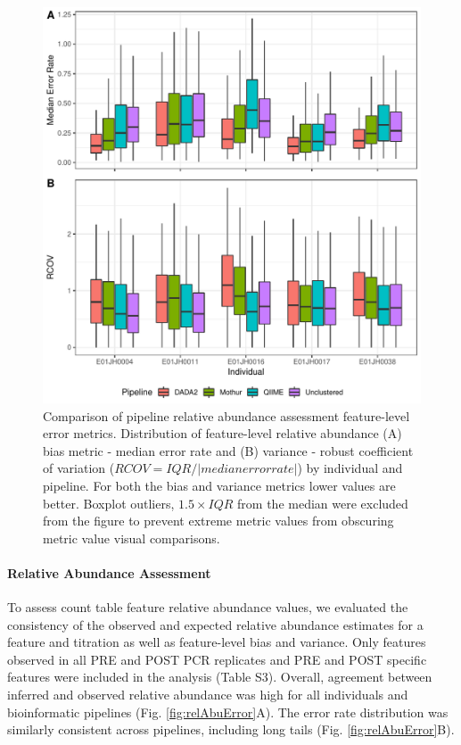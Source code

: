\documentclass[linenumbers]{bmcart}
\begin{document}
\begin{figure}
\centering
\includegraphics{relAbuErrorMetrics-1.pdf}
\caption{\label{fig:relAbuErrorMetrics}Comparison of pipeline relative
abundance assessment feature-level error metrics. Distribution of
feature-level relative abundance (A) bias metric - median error rate and
(B) variance - robust coefficient of variation (\(RCOV=IQR/|median error rate|\)) by individual and pipeline.
For both the bias and variance metrics lower values are better.
Boxplot outliers, \(1.5\times IQR\) from the median were excluded from the figure to prevent extreme metric values
from obscuring metric value visual comparisons.}
\end{figure}


\paragraph{Relative Abundance Assessment}
To assess count table feature relative abundance values, we evaluated the consistency of
the observed and expected relative abundance estimates for a feature and
titration as well as feature-level bias and variance.
Only features observed in all PRE and POST PCR replicates
and PRE and POST specific features were included in the analysis (Table S3). Overall, agreement between inferred
and observed relative abundance was high for all individuals and
bioinformatic pipelines (Fig. \ref{fig:relAbuError}A). The error rate
distribution was similarly consistent across pipelines, including long
tails (Fig. \ref{fig:relAbuError}B).
\end{document}
